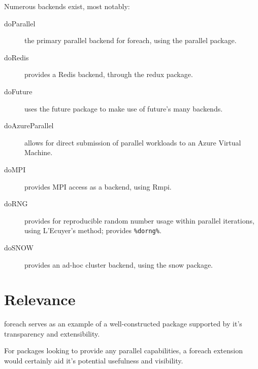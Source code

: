 \documentclass[a4paper,10pt]{article}
\begin{document}
Numerous backends exist, most notably:
\begin{description}
	\item[doParallel] the primary parallel backend for foreach, using the
	      parallel package\cite{corporation19}.
	\item[doRedis]  provides a Redis backend, through the redux package\cite{lewis20}.
	\item[doFuture] uses the future package to make use of future's many
	      backends\cite{bengtsson20do}.
	\item[doAzureParallel] allows for direct submission of parallel
	      workloads to an Azure Virtual Machine\cite{hoang20}.
	\item[doMPI] provides MPI access as a backend, using Rmpi\cite{weston17}.
	\item[doRNG] provides for reproducible random number usage within
	      parallel iterations, using L'Ecuyer's method; provides
	      \texttt{\%dorng\%}\cite{gaujoux20}.
	\item[doSNOW] provides an ad-hoc cluster backend, using the snow
	      package\cite{dosnow19}.
\end{description}

\section{Relevance}
\label{sec:relevance}

foreach serves as an example of a well-constructed package supported
by it's transparency and extensibility.

For packages looking to provide any parallel capabilities, a foreach
extension would certainly aid it's potential usefulness and
visibility.

\printbibliography{}
\end{document}
